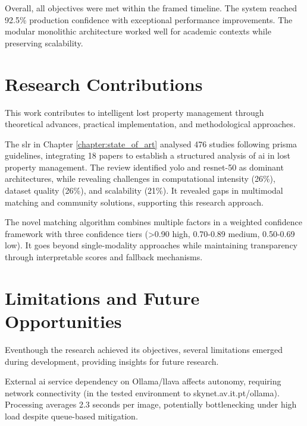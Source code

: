 Overall, all objectives were met within the framed timeline. The system reached 92.5\% production confidence with exceptional performance improvements. The modular monolithic architecture worked well for academic contexts while preserving scalability.


\section{Research Contributions} \label{section:research_contributions}

This work contributes to intelligent lost property management through theoretical advances, practical implementation, and methodological approaches.

The \ac{slr} in Chapter \ref{chapter:state_of_art} analysed 476 studies following \ac{prisma} guidelines, integrating 18 papers to establish a structured analysis of \ac{ai} in lost property management. The review identified \ac{yolo} and \ac{resnet}-50 as dominant architectures, while revealing challenges in computational intensity (26\%), dataset quality (26\%), and scalability (21\%). It revealed gaps in multimodal matching and community solutions, supporting this research approach.

The novel matching algorithm combines multiple factors in a weighted confidence framework with three confidence tiers (>0.90 high, 0.70-0.89 medium, 0.50-0.69 low). It goes beyond single-modality approaches while maintaining transparency through interpretable scores and fallback mechanisms.


\section{Limitations and Future Opportunities} \label{section:limitations_opportunities}

Eventhough the research achieved its objectives, several limitations emerged during development, providing insights for future research.

External \ac{ai} service dependency on Ollama/\ac{llava} affects autonomy, requiring network connectivity (in the tested environment to skynet.av.it.pt/ollama). Processing averages 2.3 seconds per image, potentially bottlenecking under high load despite queue-based mitigation.

